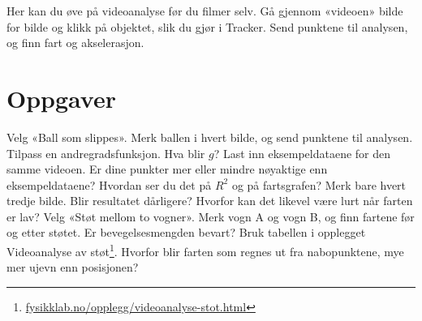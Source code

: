\documentclass[11pt]{article}
\begin{document}

Her kan du øve på videoanalyse før du filmer selv. Gå gjennom «videoen» bilde for bilde og klikk på objektet, slik du gjør i Tracker. Send punktene til analysen, og finn fart og akselerasjon.

\section*{Oppgaver}

\begin{oppgaveliste}
\oppgave {}Velg «Ball som slippes». Merk ballen i hvert bilde, og send punktene til analysen. Tilpass en andregradsfunksjon. Hva blir $g$?
\svar
\oppgave {}Last inn eksempeldataene for den samme videoen. Er dine punkter mer eller mindre nøyaktige enn eksempeldataene? Hvordan ser du det på $R^{2}$ og på fartsgrafen?
\svar
\oppgave {}Merk bare hvert tredje bilde. Blir resultatet dårligere? Hvorfor kan det likevel være lurt når farten er lav?
\svar
\oppgave {}Velg «Støt mellom to vogner». Merk vogn A og vogn B, og finn fartene før og etter støtet. Er bevegelsesmengden bevart? Bruk tabellen i opplegget Videoanalyse av støt\footnote{\url{fysikklab.no/opplegg/videoanalyse-stot.html}}.
\svar
\oppgave {}Hvorfor blir farten som regnes ut fra nabopunktene, mye mer ujevn enn posisjonen?
\svar
\end{oppgaveliste}
\end{document}
